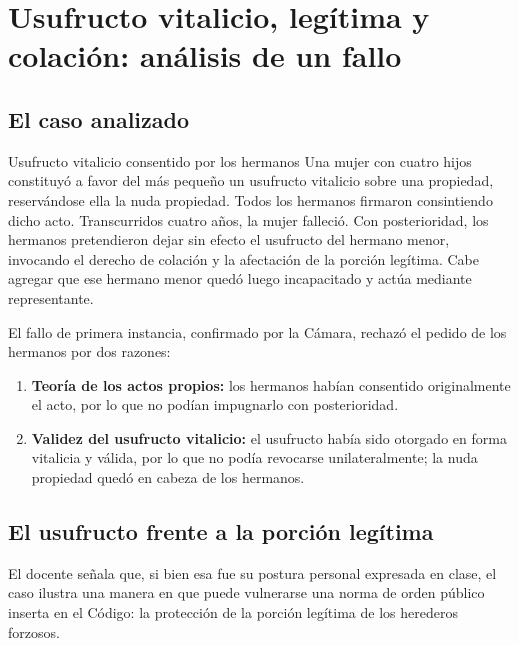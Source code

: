 \documentclass[12pt,oneside]{book}
\begin{document}
\section{Usufructo vitalicio, legítima y colación: análisis de un fallo}

\subsection{El caso analizado}

\begin{example}{Usufructo vitalicio consentido por los hermanos}
Una mujer con cuatro hijos constituyó a favor del más pequeño un usufructo vitalicio sobre una propiedad, reservándose ella la nuda propiedad. Todos los hermanos firmaron consintiendo dicho acto. Transcurridos cuatro años, la mujer falleció. Con posterioridad, los hermanos pretendieron dejar sin efecto el usufructo del hermano menor, invocando el derecho de colación y la afectación de la porción legítima. Cabe agregar que ese hermano menor quedó luego incapacitado y actúa mediante representante.
\end{example}

El fallo de primera instancia, confirmado por la Cámara, rechazó el pedido de los hermanos por dos razones:

\begin{enumerate}
\item \textbf{Teoría de los actos propios:} los hermanos habían consentido originalmente el acto, por lo que no podían impugnarlo con posterioridad.
\item \textbf{Validez del usufructo vitalicio:} el usufructo había sido otorgado en forma vitalicia y válida, por lo que no podía revocarse unilateralmente; la nuda propiedad quedó en cabeza de los hermanos.
\end{enumerate}

\subsection{El usufructo frente a la porción legítima}

\begin{note}
El docente señala que, si bien esa fue su postura personal expresada en clase, el caso ilustra una manera en que puede vulnerarse una norma de orden público inserta en el Código: la protección de la porción legítima de los herederos forzosos.
\end{note}
\end{document}
